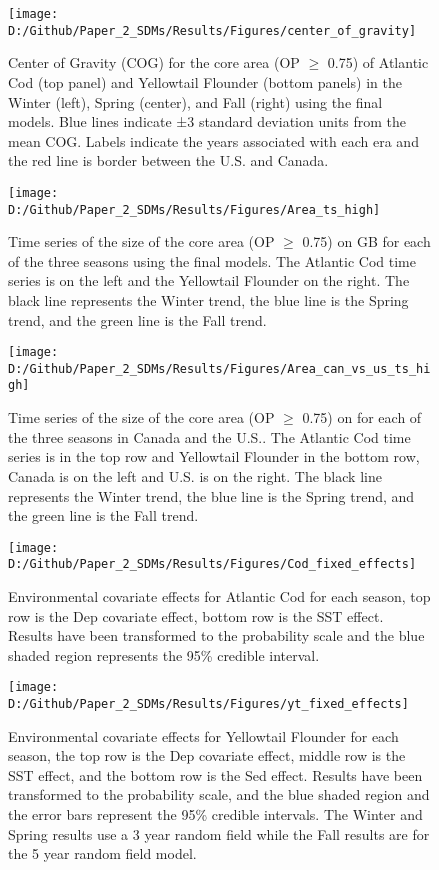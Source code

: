 \documentclass[
]{article}
\begin{document}
\begin{landscape}
\newpage
\begin{figure}
\texttt{[image: D:/Github/Paper\_2\_SDMs/Results/Figures/center\_of\_gravity]} \caption{Center of Gravity (COG) for the core area (OP $\geq$ 0.75) of Atlantic Cod (top panel) and Yellowtail Flounder (bottom panels) in the Winter (left), Spring (center), and Fall (right) using the final models.  Blue lines indicate ±3 standard deviation units from the mean COG. Labels indicate the years associated with each era and the red line is border between the U.S. and Canada.}\label{fig:cog-hep}
\end{figure}

\newpage
\begin{figure}
\texttt{[image: D:/Github/Paper\_2\_SDMs/Results/Figures/Area\_ts\_high]} \caption{Time series of the size of the core area (OP $\geq$ 0.75) on GB for each of the three seasons using the final models.  The Atlantic Cod time series is on the left and the Yellowtail Flounder on the right.  The black line represents the Winter trend, the blue line is the Spring trend, and the green line is the Fall trend.  }\label{fig:area-hep}
\end{figure}

\newpage
\begin{figure}
\texttt{[image: D:/Github/Paper\_2\_SDMs/Results/Figures/Area\_can\_vs\_us\_ts\_high]} \caption{Time series of the size of the core area (OP $\geq$ 0.75) on for each of the three seasons in Canada and the U.S..  The Atlantic Cod time series is in the top row and Yellowtail Flounder in the bottom row, Canada is on the left and U.S. is on the right.  The black line represents the Winter trend, the blue line is the Spring trend, and the green line is the Fall trend.  }\label{fig:area-can-vs-us-hep}
\end{figure}

\newpage
\begin{figure}
\texttt{[image: D:/Github/Paper\_2\_SDMs/Results/Figures/Cod\_fixed\_effects]} \caption{Environmental covariate effects for Atlantic Cod for each season, top row is the Dep covariate effect, bottom row is the SST effect. Results have been transformed to the probability scale and the blue shaded region represents the 95\% credible interval.}\label{fig:cod-fe}
\end{figure}

\newpage
\begin{figure}
\texttt{[image: D:/Github/Paper\_2\_SDMs/Results/Figures/yt\_fixed\_effects]} \caption{Environmental covariate effects for Yellowtail Flounder for each season, the top row is the Dep covariate effect, middle row is the SST effect, and the bottom row is the Sed effect. Results have been transformed to the probability scale, and the blue shaded region and the error bars represent the 95\% credible intervals. The Winter and Spring results use a 3 year random field while the Fall results are for the 5 year random field model.}\label{fig:yt-fe}
\end{figure}


\end{landscape}
\end{document}
